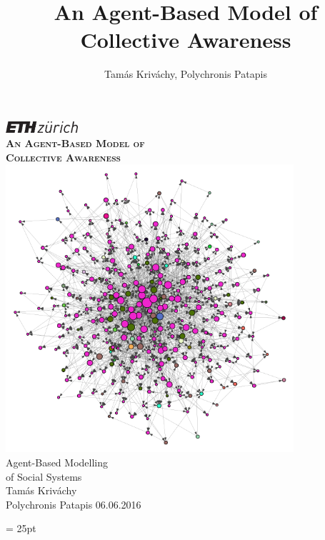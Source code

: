 \documentclass [12pt,a4paper,twoside]{article}
\title{An Agent-Based Model of Collective Awareness}
\author{Tamás Kriváchy, Polychronis Patapis}
\begin{document}




\begin{titlepage}
 \begin{center}
   \includegraphics[width=0.2\textwidth]{report/eth_logo_kurz_pos}\\[1cm]
   {\bf \textsc{\LARGE  An Agent-Based Model of \\[0.1cm] Collective Awareness}}\\[1cm]
   \includegraphics[width=0.8\textwidth]{report/graph}\\[0.1cm]
   {\huge Agent-Based Modelling \\ of Social Systems}\\[1.5cm]
   {\LARGE Tamás Kriváchy}\\
   \LARGE Polychronis Patapis
 \vfill 
 {\large 06.06.2016} \\
 
 \end{center}
\end{titlepage}



\newpage
\pagestyle{fancy}
  \fancyhead{}
  \headsep = 25pt
  \fancyhead[LE,RO]{\rightmark}
  \fancyhead[LO,RE]{\leftmark}
\end{document}
